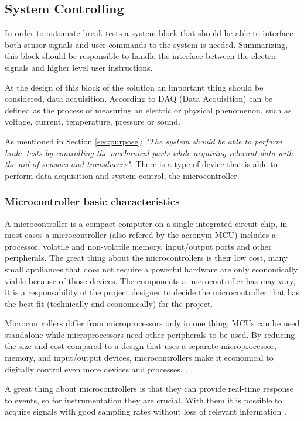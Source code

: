 \subsection{System Controlling}\label{ssec:mcu-review}
	In order to automate break tests a system block that should be able to interface both sensor signals and user commands to the system is needed. Summarizing, this block should be responsible to handle the interface between the electric signals and higher level user instructions.
	\par
	At the design of this block of the solution an important thing should be considered, data acquisition. According to \cite{ni-daq} DAQ (Data Acquisition) can be defined as the process of measuring an electric or physical phenomenon, such as voltage, current, temperature, pressure or sound.
	\par
	As mentioned in Section \ref{sec:purpose}: \textit{"The system should be able to perform brake tests by controlling the mechanical parts while acquiring relevant data with the aid of sensors and transducers"}. There is a type of device that is able to perform data acquisition and system control, the microcontroller.

	\subsubsection{Microcontroller basic characteristics}\label{sssec:microcontroller-basic-characteristics}

		A microcontroller is a compact computer on a single integrated circuit chip, in most cases a microcontroller (also refered by the acronym MCU) includes a processor, volatile and non-volatile memory, input/output ports and other peripherals. The great thing about the microcontrollers is their low cost, many small appliances that does not require a powerful hardware are only economically viable because of those devices. The components a microcontroller has may vary, it is a responsability of the project designer to decide the microcontroller that has the best fit (technically and economically) for the project.
		\par
		Microcontrollers differ from microprocessors only in one thing, MCUs can be used standalone while microprocessors need other peripherals to be used. By reducing the size and cost compared to a design that uses a separate microprocessor, memory, and input/output devices, microcontrollers make it economical to digitally control even more devices and processes. \cite{mcuDef}.
		\par
		A great thing about microcontrollers is that they can provide real-time response to events, so for instrumentation they are crucial. With them it is possible to acquire signals with good sampling rates without loss of relevant information \cite{bartz2004data}.

